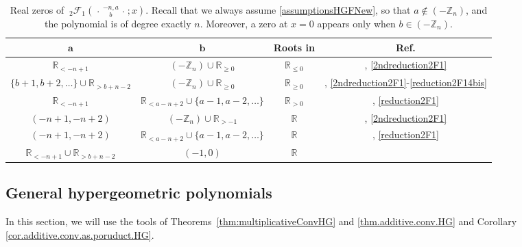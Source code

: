 \documentclass[reqno,11pt]{amsart}
\theoremstyle{remark}
\newcommand{\R}{\mathbb{R}}
\newcommand{\Z}{\mathbb{Z}}
\newcommand*\pFq[5]{%
 {\ }_{#1}{\mathcal F}_{#2}{\left(\genfrac..{0pt}{}{#3}{#4};#5\right)}%
}
\begin{document}
\begin{table}[h]
    \centering
\begin{tabular}{|c|c|c|c|}
\hline $\mathbf{a}$ & $\mathbf{b}$ & \textbf{Roots in} & \textbf{Ref.} \\
\hline $ \R_{<-n+1}$ & $(-\Z_n)\cup\R_{\geq 0}$ & $\R_{\leq 0}$ & {\cite[Thm 1]{dominici2013real}}, \eqref{2ndreduction2F1} \\
\hline $\{b+1, b+2, \dots\} \cup \R_{>b+n-2}  $ & $ (-\Z_n)\cup\R_{\geq 0} $ & $\R_{\geq 0}$ & {\cite[Thm 1,8]{dominici2013real}}, \eqref{2ndreduction2F1}-\eqref{reduction2F14bis}  \\
\hline $\R_{<-n+1}$ & $\R_{<a-n+2} \cup \{a-1, a-2, \dots\} $ & $\R_{>0}$ & {\cite[Thm 1,8]{dominici2013real}}, \eqref{reduction2F1} \\
\hline $(-n+1,-n+2)$ & $(-\Z_n) \cup \R_{>-1}  $ & $\mathbb{R}$ & {\cite[Thm 6,8]{dominici2013real}}, \eqref{2ndreduction2F1} \\
\hline $(-n+1,-n+2)$ & $  \R_{<a-n+2} \cup\{a-1, a-2, \dots \} $ & $\mathbb{R}$ & {\cite[Thm 6,7]{dominici2013real}}, \eqref{reduction2F1} \\
\hline $\R_{<-n+1} \cup \R_{>b+n-2}$  & $(-1,0)$ & $\R$  & {\cite[Thm 6,7]{dominici2013real}}\\
\hline
\end{tabular}
\vspace{2mm}
\caption{Real zeros of $\pFq{2}{1}{-n,  a}{ b}{x}$. Recall that we always assume \eqref{assumptionsHGFNew}, so that $
  a \notin (-\Z_n)$, and the polynomial is of degree exactly $n$. Moreover, a zero at $x=0$ appears only when $b \in (-\Z_n)$. 
}
    \label{tab:2F1}
\end{table}    



\subsection{General hypergeometric polynomials}
\label{ssec:General.hypergeometric.polynomials}


In this section, we will use the tools of Theorems~\ref{thm:multiplicativeConvHG} and \ref{thm.additive.conv.HG} and Corollary \ref{cor.additive.conv.as.poruduct.HG}. 
 
\end{document}
